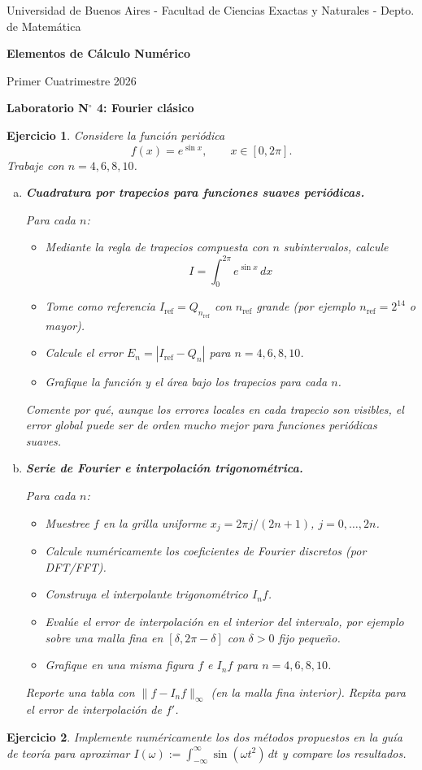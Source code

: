\documentclass[12pt]{article}
\newtheorem{exercise}{Ejercicio}
\newcommand{\bej}{\begin{exercise}\rm}
\newcommand{\fej}{\end{exercise}}
\begin{document}
\centerline{{\small Universidad de Buenos Aires - Facultad de Ciencias Exactas y Naturales - Depto. de Matemática}}
 
 \vskip 0.2cm
 \hrulefill
 \vskip 0.2cm

 \centerline{{\bf\Huge {\sc Elementos de Cálculo Numérico}}}
 \vskip 0.2cm
 \centerline{\ttfamily Primer Cuatrimestre 2026}
 \hrulefill

 \bigskip
 \centerline{\bf Laboratorio N$^\circ$ 4: Fourier clásico}
 \bigskip

\bej
Considere la función periódica
\[
f(x)=e^{\sin x},\qquad x\in[0,2\pi].
\]
Trabaje con $n=4,6,8,10$.

\begin{enumerate}[(a)]
\item \textbf{Cuadratura por trapecios para funciones suaves periódicas.}

Para cada $n$:
\begin{itemize}
\item Mediante la regla de trapecios compuesta con $n$ subintervalos, calcule
\[
I=\int_0^{2\pi}e^{\sin x}\,dx
\]

\item Tome como referencia $I_{\mathrm{ref}}=Q_{n_{\mathrm{ref}}}$ con $n_{\mathrm{ref}}$ grande (por ejemplo $n_{\mathrm{ref}}=2^{14}$ o mayor).
\item Calcule el error $E_n=|I_{\mathrm{ref}}-Q_n|$ para $n=4,6,8,10$.
\item Grafique la función y el área bajo los trapecios para cada $n$.
\end{itemize}

Comente por qué, aunque los errores locales en cada trapecio son visibles, el error global puede ser de orden mucho mejor para funciones periódicas suaves.

\item \textbf{Serie de Fourier e interpolación trigonométrica.}

Para cada $n$:
\begin{itemize}
\item Muestree $f$ en la grilla uniforme $x_j=2\pi j/(2n+1)$, $j=0,\dots,2n$.
\item Calcule numéricamente los coeficientes de Fourier discretos (por DFT/FFT).
\item Construya el interpolante trigonométrico $I_n f$.
\item Evalúe el error de interpolación en el interior del intervalo, por ejemplo sobre una malla fina en $[\delta,2\pi-\delta]$ con $\delta>0$ fijo pequeño.
\item Grafique en una misma figura $f$ e $I_n f$ para $n=4,6,8,10$.
\end{itemize}

Reporte una tabla con $\|f-I_n f\|_\infty$ (en la malla fina interior). Repita para el error de interpolación de $f'$.
\end{enumerate}
\fej

\bej
Implemente numéricamente los dos métodos propuestos en la guía de teoría para aproximar $I(\omega):=\int_{-\infty}^{\infty}\sin(\omega t^2)\,dt$ y compare los resultados. 
\fej
\end{document}
